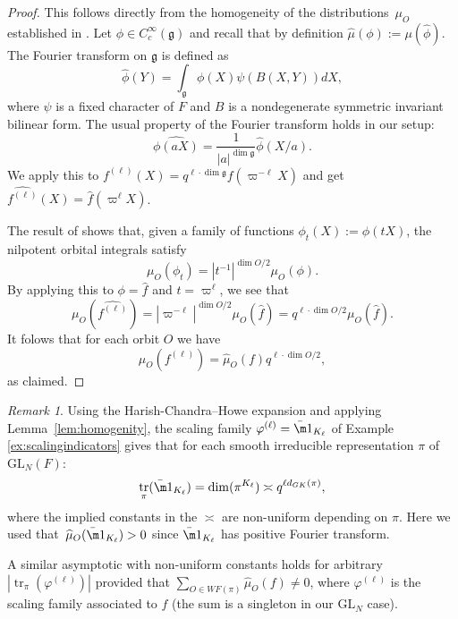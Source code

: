 \documentclass{amsart}
\newcommand{\wh}{\widehat}
\DeclareMathOperator{\tr}{tr}
\newcommand{\GL}{\mathrm{GL}}
\newcommand{\1}{\m 1}
\newcommand{\fg}{\mathfrak{g}}
\theoremstyle{remark}
\newtheorem{rmk}[thm]{Remark}
\theoremstyle{definition}
\numberwithin{equation}{subsection}
\begin{document}
\begin{proof}
This follows directly from the homogeneity of the distributions~$\mu_{O}$ established in \cite{HC99admissible}.  Let $\phi \in C^\infty_c(\fg)$ and recall that by definition $\hat{\mu}(\phi) := \mu(\hat{\phi})$.
The Fourier transform on $\fg$ is defined as \[ \hat{\phi}(Y) = \int_\fg \phi(X) \psi(B(X,Y)) dX,  \] where $\psi$ is a fixed character of $F$ and $B$ is a nondegenerate symmetric invariant bilinear form.  The usual property of the Fourier transform holds in our setup: \begin{equation} \label{eq Fourier scaling}
    \widehat{
\phi(aX)} = \frac{1}{|a|^{\dim \fg}}\hat{\phi}(X/a).
\end{equation}  %
We apply this to $f^{(\ell)}(X) = q^{\ell\cdot \dim \fg} f(\varpi^{-\ell}X)$ and get $\wh{f^{(\ell)}}(X) = \hat{f}(\varpi^{\ell}X)$.

The result of \cite[\S 3.1]{HC99admissible} shows that, given a family of functions $\phi_t(X) := \phi(tX)$, the nilpotent orbital integrals satisfy 
\[ 
\mu_{ O}(\phi_t) %
= |t^{-1}|^{\dim O/2}\mu_{ O}(\phi).
\] 
By applying this to $\phi = \hat f$ and $t=\varpi^\ell$, we see that 
\[
\mu_{ O}(\wh{f^{(\ell)}}) = |\varpi^{-\ell}|^{\dim  O/2}\mu_ O(\hat f) = q^{\ell \cdot \dim O/2}\mu_{O}( \hat f).
\] 
It folows that for each orbit $O$ we have 
\begin{equation}\label{eq:homogeneity}
\hat{\mu}_O(f^{(\ell)}) = \hat{\mu}_O(f) q^{\ell \cdot \dim O/2},
\end{equation} 
as claimed.
\end{proof}


\begin{rmk}
Using the Harish-Chandra--Howe expansion and applying Lemma~\ref{lem:homogenity}, the scaling family $\varphi^{(\ell)} = \bar \1_{K_\ell}$ of Example \ref{ex:scalingindicators} gives that for each smooth irreducible representation $\pi$ of $\GL_N(F)$:
\[
\tr_\pi(\bar \1_{K_\ell}) = \dim(\pi^{K_\ell}) \asymp q^{\ell d_{GK}(\pi)},
\]
where the implied constants in the $\asymp$ are non-uniform depending on $\pi$. Here we used that~$\wh \mu_O(\bar \1_{K_\ell}) > 0$ since $\bar \1_{K_\ell}$ has positive Fourier transform.  

A similar asymptotic with non-uniform constants holds for arbitrary $|\tr_\pi(\varphi^{(\ell)})|$ provided that $\sum_{O \in WF(\pi)} \wh \mu_O(f) \neq 0$, where $\varphi^{(\ell)}$ is the scaling family associated to $f$ (the sum is a singleton in our $\GL_N$ case). %
\end{rmk}
\end{document}
